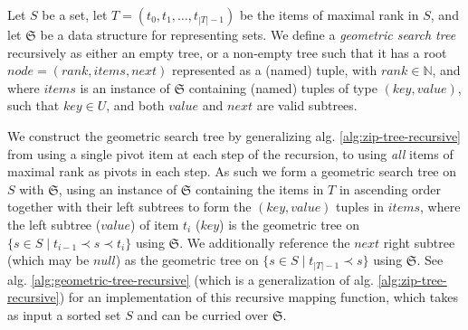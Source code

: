 \documentclass{article}
\begin{document}
Let $S$ be a set, let $T = (t_0, t_1, \ldots, t_{|T| - 1})$ be the items of maximal rank in $S$, and let $\mathfrak{S}$ be a data structure for representing sets. We define a \emph{geometric search tree} recursively as either an empty tree, or a non-empty tree such that it has a root $node = \left(rank, items, next\right)$ represented as a (named) tuple, with $rank \in \mathbb{N}$, and where $items$ is an instance of $\mathfrak{S}$ containing (named) tuples of type $\left(key,value\right)$, such that $key \in U$, and both $value$ and $next$ are valid subtrees.

\begin{algorithm}[ht]
    \caption{Recursive geometric tree construction}\label{alg:geometric-tree-recursive}
    \DontPrintSemicolon

\end{algorithm}

We construct the geometric search tree by generalizing alg. \ref{alg:zip-tree-recursive} from using a single pivot item at each step of the recursion, to using \emph{all} items of maximal rank as pivots in each step. As such we form a geometric search tree on $S$ with $\mathfrak{S}$, using an instance of $\mathfrak{S}$ containing the items in $T$ in ascending order together with their left subtrees to form the $\left(key,value\right)$ tuples in $items$, where the left subtree ($value$) of item $t_i$ ($key$) is the geometric tree on $\{s \in S \mid t_{i - 1} \prec s \prec t_i\}$ using $\mathfrak{S}$. We additionally reference the $next$ right subtree (which may be $null$) as the geometric tree on $\{s \in S \mid t_{|T| - 1} \prec s\}$ using $\mathfrak{S}$. See alg. \ref{alg:geometric-tree-recursive} (which is a generalization of alg. \ref{alg:zip-tree-recursive}) for an implementation of this recursive mapping function, which takes as input a sorted set $S$ and can be curried over $\mathfrak{S}$.
\end{document}
